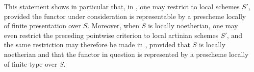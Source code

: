 This statement shows in particular that, in , one may
restrict to local schemes \(S'\), provided the functor under
consideration is representable by a prescheme locally of finite
presentation over \(S\).  Moreover, when \(S\) is locally noetherian,
one may even restrict the preceding pointwise criterion to local
artinian schemes \(S'\), and the same restriction may therefore be
made in , provided that \(S\) is locally noetherian and
that the functor in question is represented by a prescheme locally of
finite type over \(S\).

